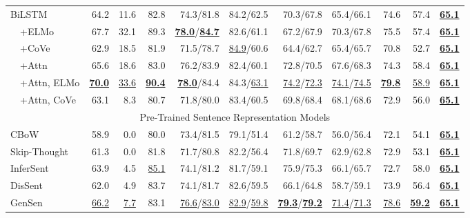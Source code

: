 \begin{table*}[t]
\begin{tabular}{lrrrrrrrrrr}
BiLSTM & 64.2 & 11.6 & 82.8 & 74.3/81.8 & 84.2/62.5 & 70.3/67.8 & 65.4/66.1 & 74.6 & 57.4 & \textbf{\underline{65.1}} \\

~~+ELMo & 67.7 & 32.1 & 89.3 & \textbf{\underline{78.0}}/\textbf{\underline{84.7}} & 82.6/61.1 & 67.2/67.9 & 70.3/67.8 & 75.5 & 57.4 & \textbf{\underline{65.1}} \\

~~+CoVe & 62.9 & 18.5 & 81.9 & 71.5/78.7 & \underline{84.9}/60.6 & 64.4/62.7 & 65.4/65.7 & 70.8 & 52.7 & \textbf{\underline{65.1}} \\

~~+Attn & 65.6 & 18.6 & 83.0 & 76.2/83.9 & 82.4/60.1 & 72.8/70.5 & 67.6/68.3 & 74.3 & 58.4 & \textbf{\underline{65.1}} \\

~~+Attn, ELMo & \textbf{\underline{70.0}} & \underline{33.6} & \textbf{\underline{90.4}} & \textbf{\underline{78.0}}/84.4 & 84.3/\underline{63.1} & \underline{74.2}/\underline{72.3} & \underline{74.1}/\underline{74.5} & \textbf{\underline{79.8}} & \underline{58.9} & \textbf{\underline{65.1}} \\

~~+Attn, CoVe & 63.1 & 8.3 & 80.7 & 71.8/80.0 & 83.4/60.5 & 69.8/68.4 & 68.1/68.6 & 72.9 & 56.0 & \textbf{\underline{65.1}} \\

\midrule
\multicolumn{11}{c}{Pre-Trained Sentence Representation Models} \\
\midrule

CBoW & 58.9 & 0.0 & 80.0 & 73.4/81.5 & 79.1/51.4 & 61.2/58.7 & 56.0/56.4 & 72.1 & 54.1 & \textbf{\underline{65.1}} \\

Skip-Thought & 61.3 & 0.0 & 81.8 & 71.7/80.8 & 82.2/56.4 & 71.8/69.7 & 62.9/62.8 & 72.9 & 53.1 & \textbf{\underline{65.1}} \\

InferSent & 63.9 & 4.5 & \underline{85.1} & 74.1/81.2 & 81.7/59.1 & 75.9/75.3 & 66.1/65.7 & 72.7 & 58.0 & \textbf{\underline{65.1}} \\

DisSent & 62.0 & 4.9 & 83.7 & 74.1/81.7 & 82.6/59.5 & 66.1/64.8 & 58.7/59.1 & 73.9 & 56.4 & \textbf{\underline{65.1}} \\

GenSen & \underline{66.2} & \underline{7.7} & 83.1 & \underline{76.6}/\underline{83.0} & \underline{82.9}/\underline{59.8} & \textbf{\underline{79.3}}/\textbf{\underline{79.2}} & \underline{71.4}/\underline{71.3} & \underline{78.6} & \textbf{\underline{59.2}} & \textbf{\underline{65.1}} \\


\end{tabular}
\end{table*}
